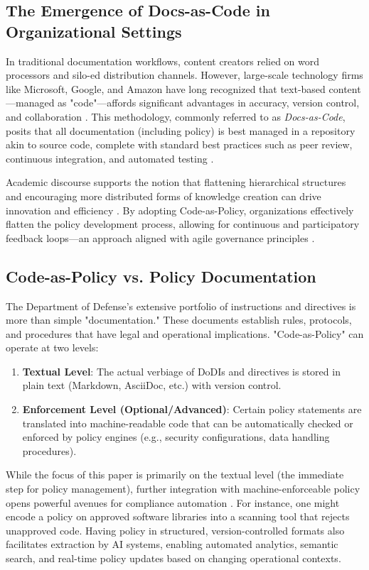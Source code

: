 \documentclass[11pt]{article}
\begin{document}
	\subsection{The Emergence of Docs-as-Code in Organizational Settings}
	In traditional documentation workflows, content creators relied on word processors and silo-ed distribution channels. However, large-scale technology firms like Microsoft, Google, and Amazon have long recognized that text-based content---managed as "code"---affords significant advantages in accuracy, version control, and collaboration \cite{Kitchin2014}. This methodology, commonly referred to as \emph{Docs-as-Code}, posits that all documentation (including policy) is best managed in a repository akin to source code, complete with standard best practices such as peer review, continuous integration, and automated testing \cite{Lamport2018}.

	Academic discourse supports the notion that flattening hierarchical structures and encouraging more distributed forms of knowledge creation can drive innovation and efficiency \cite{Morrison2017}. By adopting Code-as-Policy, organizations effectively flatten the policy development process, allowing for continuous and participatory feedback loops---an approach aligned with agile governance principles \cite{ConboyFitzgerald2010}.

	\subsection{Code-as-Policy vs. Policy Documentation}
	The Department of Defense's extensive portfolio of instructions and directives is more than simple "documentation." These documents establish rules, protocols, and procedures that have legal and operational implications. "Code-as-Policy" can operate at two levels:

	\begin{enumerate}
		\item \textbf{Textual Level}: The actual verbiage of DoDIs and directives is stored in plain text (Markdown, AsciiDoc, etc.) with version control.
		\item \textbf{Enforcement Level (Optional/Advanced)}: Certain policy statements are translated into machine-readable code that can be automatically checked or enforced by policy engines (e.g., security configurations, data handling procedures).
	\end{enumerate}

	While the focus of this paper is primarily on the textual level (the immediate step for policy management), further integration with machine-enforceable policy opens powerful avenues for compliance automation \cite{Hashimoto2017}. For instance, one might encode a policy on approved software libraries into a scanning tool that rejects unapproved code. Having policy in structured, version-controlled formats also facilitates extraction by AI systems, enabling automated analytics, semantic search, and real-time policy updates based on changing operational contexts.
\end{document}
